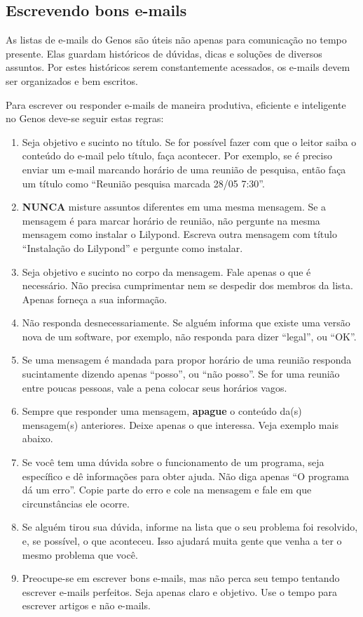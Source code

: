 \documentclass[12pt,brazil]{book}
\begin{document}
\subsection{Escrevendo bons e-mails}
\label{sec:escrevendo-bons-e}

As listas de e-mails do Genos são úteis não apenas para comunicação no
tempo presente. Elas guardam históricos de dúvidas, dicas e soluções
de diversos assuntos. Por estes históricos serem constantemente
acessados, os e-mails devem ser organizados e bem escritos.

Para escrever ou responder e-mails de maneira produtiva, eficiente e
inteligente no Genos deve-se seguir estas regras:

\begin{enumerate}
\item Seja objetivo e sucinto no título. Se for possível fazer com que
  o leitor saiba o conteúdo do e-mail pelo título, faça acontecer. Por
  exemplo, se é preciso enviar um e-mail marcando horário de uma
  reunião de pesquisa, então faça um título como ``Reunião pesquisa
  marcada 28/05 7:30''.
\item \textbf{NUNCA} misture assuntos diferentes em uma mesma
  mensagem. Se a mensagem é para marcar horário de reunião, não
  pergunte na mesma mensagem como instalar o Lilypond. Escreva outra
  mensagem com título ``Instalação do Lilypond'' e pergunte como
  instalar.
\item Seja objetivo e sucinto no corpo da mensagem. Fale apenas o que
  é necessário. Não precisa cumprimentar nem se despedir dos membros
  da lista. Apenas forneça a sua informação.
\item Não responda desnecessariamente. Se alguém informa que existe
  uma versão nova de um software, por exemplo, não responda para dizer
  ``legal'', ou ``OK''.
\item Se uma mensagem é mandada para propor horário de uma reunião
  responda sucintamente dizendo apenas ``posso'', ou ``não posso''. Se
  for uma reunião entre poucas pessoas, vale a pena colocar seus
  horários vagos.
\item Sempre que responder uma mensagem, \textbf{apague} o conteúdo
  da(s) mensagem(s) anteriores. Deixe apenas o que interessa. Veja
  exemplo mais abaixo.
\item Se você tem uma dúvida sobre o funcionamento de um programa,
  seja específico e dê informações para obter ajuda. Não diga apenas
  ``O programa dá um erro''. Copie parte do erro e cole na mensagem e
  fale em que circunstâncias ele ocorre.
\item Se alguém tirou sua dúvida, informe na lista que o seu problema
  foi resolvido, e, se possível, o que aconteceu. Isso ajudará muita
  gente que venha a ter o mesmo problema que você.
\item Preocupe-se em escrever bons e-mails, mas não perca seu tempo
  tentando escrever e-mails perfeitos. Seja apenas claro e
  objetivo. Use o tempo para escrever artigos e não e-mails.
\end{enumerate}
\end{document}
